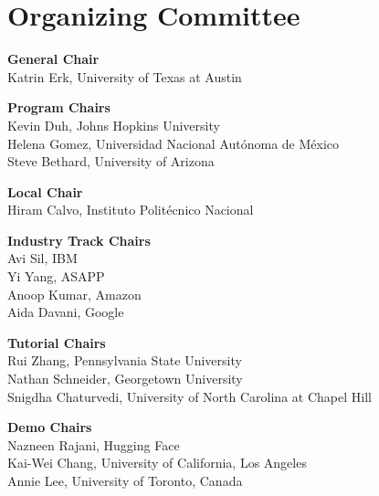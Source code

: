\markboth{}{} %
\markright{}{} %
\setlength{\parindent}{0pt}
\setlength{\parskip}{2ex}

\section{Organizing Committee}{}
{\bf General Chair} \\
\hspace*{0.2in} Katrin Erk, University of Texas at Austin

{\bf Program Chairs} \\
\hspace*{0.2in} Kevin Duh, Johns Hopkins University \\
\hspace*{0.2in} Helena Gomez, Universidad Nacional Aut\'onoma de M\'exico \\
\hspace*{0.2in} Steve Bethard, University of Arizona

{\bf Local Chair} \\
\hspace*{0.2in} Hiram Calvo, Instituto Polit\'ecnico Nacional

{\bf Industry Track Chairs} \\
\hspace*{0.2in} Avi Sil, IBM \\
\hspace*{0.2in} Yi Yang, ASAPP \\
\hspace*{0.2in} Anoop Kumar, Amazon \\
\hspace*{0.2in} Aida Davani, Google

{\bf Tutorial Chairs} \\
\hspace*{0.2in} Rui Zhang, Pennsylvania State University \\
\hspace*{0.2in} Nathan Schneider, Georgetown University \\
\hspace*{0.2in} Snigdha Chaturvedi, University of North Carolina at Chapel Hill 

{\bf Demo Chairs} \\
\hspace*{0.2in} Nazneen Rajani, Hugging Face \\
\hspace*{0.2in} Kai-Wei Chang, University of California, Los Angeles \\
\hspace*{0.2in} Annie Lee, University of Toronto, Canada

